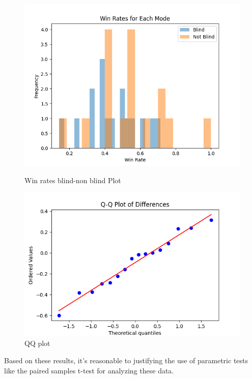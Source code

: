 \documentclass[11pt,a4paper]{report}
\begin{document}
\begin{figure}
  \begin{minipage}{0.5\textwidth}
    \centering
    \includegraphics[width=\textwidth]{img/win_rates.png}
    \caption{Win rates blind-non blind Plot}
    \label{fig:win_rates}
  \end{minipage}%
  \begin{minipage}{0.5\textwidth}
    \centering
    \includegraphics[width=\textwidth]{img/qq_plot.png}
    \caption{QQ plot}
    \label{fig:qq_plot}
  \end{minipage}
\end{figure}

\noindent Based on these results, it's reasonable to justifying the use of parametric tests like the paired samples t-test for analyzing these data.
\end{document}
